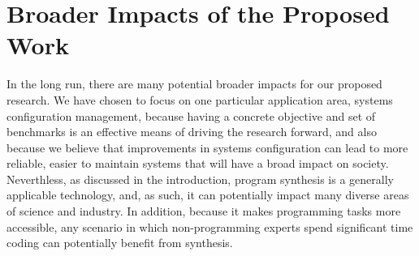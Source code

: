 
\section{Broader Impacts of the Proposed Work}
\label{sec:impact}

In the long run, there are many potential broader impacts for our
proposed research.  We have chosen to focus on one particular application
area, systems configuration management, because having a concrete objective
and set of benchmarks is an effective means of driving the research forward,
and also because we believe that improvements in systems configuration
can lead to more reliable, easier to maintain systems that will have
a broad impact on society.
Neverthless, as discussed in the introduction, program
synthesis is a generally applicable technology, and, as such, it can
potentially impact many diverse areas of science and industry.
In addition, because it makes programming tasks more accessible, any scenario in
which non-programming experts spend significant time coding can
potentially benefit from synthesis.  



